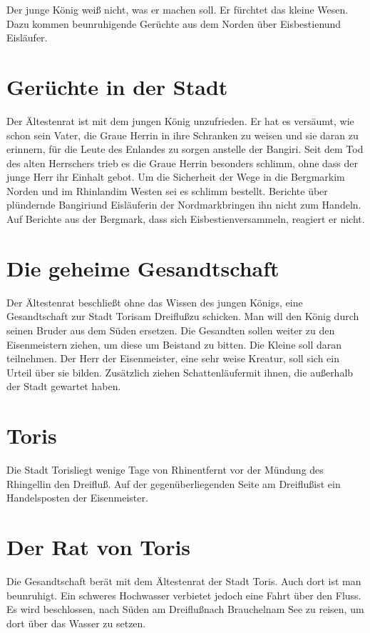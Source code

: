 \documentclass[12pt,a4paper,onecolumn,twoside,ngerman]{book}
\newcommand{\Bangiri}{Bangiri}
\newcommand{\Enland}{Enland}
\newcommand{\Schattenjager}{Schattenläufer}
\newcommand{\Nordmark}{Nordmark}
\newcommand{\Bergmark}{Bergmark}
\newcommand{\Eislaufer}{Eisläufer}
\newcommand{\Eisbestien}{Eisbestien}
\newcommand{\Rhinland}{Rhinland}
\newcommand{\Rhingell}{Rhingell}
\newcommand{\Rhin}{Rhin}
\newcommand{\Dreifluss}{Dreifluß}
\newcommand{\Toris}{Toris}
\newcommand{\Braucheln}{Braucheln}
\newcommand{\Eisenmeister}{Eisenmeister}
\begin{document}
Der junge König weiß nicht, was er machen soll. Er fürchtet das kleine Wesen. Dazu kommen beunruhigende Gerüchte aus dem Norden über \Eisbestien und \Eislaufer. 

\section{Gerüchte in der Stadt}
Der Ältestenrat ist mit dem jungen König unzufrieden. Er hat es versäumt, wie schon sein Vater, die Graue Herrin in ihre Schranken zu weisen und sie daran zu erinnern, für die Leute des \Enland{es} zu sorgen anstelle der \Bangiri. Seit dem Tod des alten Herrschers trieb es die Graue Herrin besonders schlimm, ohne dass der junge Herr ihr Einhalt gebot. Um die Sicherheit der Wege in die \Bergmark im Norden und im \Rhinland im Westen sei es schlimm bestellt. Berichte über plündernde \Bangiri und \Eislaufer in der \Nordmark bringen ihn nicht zum Handeln. Auf Berichte aus der \Bergmark, dass sich \Eisbestien versammeln, reagiert er nicht.

\section{Die geheime Gesandtschaft}
Der Ältestenrat beschließt ohne das Wissen des jungen Königs, eine Gesandtschaft zur Stadt \Toris am \Dreifluss zu schicken. Man will den König durch seinen Bruder aus dem Süden ersetzen. Die Gesandten sollen weiter zu den \Eisenmeister{n} ziehen, um diese um Beistand zu bitten. Die Kleine soll daran teilnehmen. Der Herr der \Eisenmeister, eine sehr weise Kreatur, soll sich ein Urteil über sie bilden. Zusätzlich ziehen \Schattenjager mit ihnen, die außerhalb der Stadt gewartet haben.

\section{\Toris}
Die Stadt \Toris liegt wenige Tage von \Rhin entfernt vor der Mündung des \Rhingell in den \Dreifluss. Auf der gegenüberliegenden Seite am \Dreifluss ist ein Handelsposten der \Eisenmeister.

\section{Der Rat von \Toris}
Die Gesandtschaft berät mit dem Ältestenrat der Stadt \Toris. Auch dort ist man beunruhigt. Ein schweres Hochwasser verbietet jedoch eine Fahrt über den Fluss. Es wird beschlossen, nach Süden am \Dreifluss nach \Braucheln am See zu reisen, um dort über das Wasser zu setzen.
\end{document}
